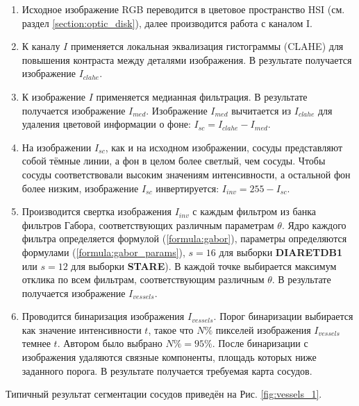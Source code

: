\documentclass[12pt,fleqn]{article}
\begin{document}
\begin{enumerate}
\item Исходное изображение RGB переводится в цветовое пространство HSI (см. раздел \ref{section:optic_disk}), далее производится работа с каналом I.
\item К каналу $I$ применяется локальная эквализация гистограммы (CLAHE) для повышения контраста между деталями изображения. В результате получается изображение $I_{clahe}$.
\item К изображение $I$ применяется медианная фильтрация. В результате получается изображение $I_{med}$. Изображение $I_{med}$ вычитается из $I_{clahe}$ для удаления цветовой информации о фоне: $I_{sc} = I_{clahe} - I_{med}$.
\item На изображении $I_{sc}$, как и на исходном изображении, сосуды представляют собой тёмные линии, а фон в целом более светлый, чем сосуды. Чтобы сосуды соответствовали высоким значениям интенсивности, а остальной фон более низким, изображение $I_{sc}$ инвертируется: $I_{inv} = 255 - I_{sc}$.
\item Производится свертка изображения $I_{inv}$ с каждым фильтром из банка фильтров Габора, соответствующих различным параметрам $\theta$. Ядро каждого фильтра определяется формулой (\ref{formula:gabor}), параметры определяются формулами (\ref{formula:gabor_params}), $s = 16$ для выборки \textbf{DIARETDB1} или $s = 12$ для выборки \textbf{STARE}). В каждой точке выбирается максимум отклика по всем фильтрам, соответствующим различным $\theta$. В результате получается изображение $I_{vessels}$.
\item Проводится бинаризация изображения $I_{vessels}$. Порог бинаризации выбирается как значение интенсивности $t$, такое что $N\%$ пикселей изображения $I_{vessels}$ темнее $t$. Автором было выбрано $N\% = 95\%$. После бинаризации с изображения удаляются связные компоненты, площадь которых ниже заданного порога. В результате получается требуемая карта сосудов.
\end{enumerate}

Типичный результат сегментации сосудов приведён на Рис. \ref{fig:vessels_1}.
\end{document}
